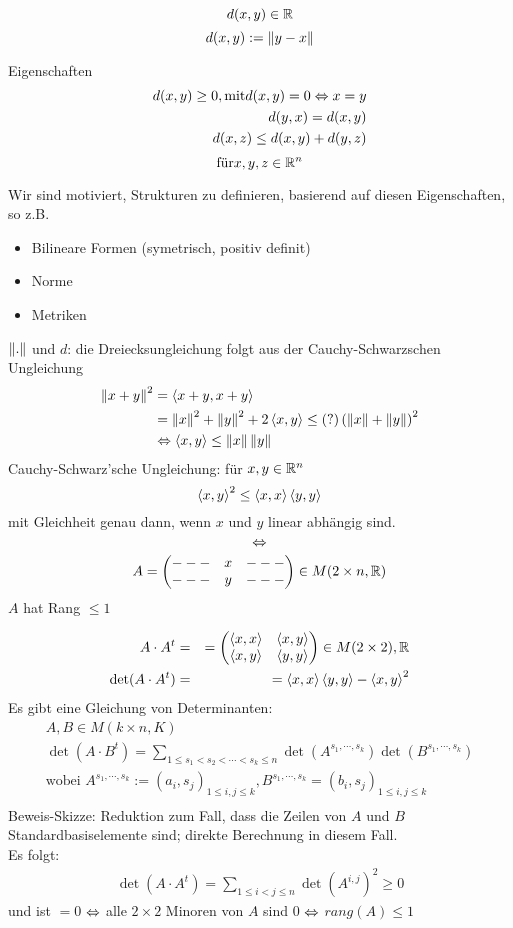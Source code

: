 \[d(x,y)\in\mathbb{R}\]
\[d(x,y):=\left\| y-x \right\|\]
\begin{Bem}{Eigenschaften}
\begin{align*}
  d(x,y)\geq0, \text{mit}d(x,y)=0 \Leftrightarrow x=y\\
  d(y,x)=d(x,y)\\
  d(x,z)\leq d(x,y)+d(y,z)
\end{align*}
\[\text{für} x,y,z\in\mathbb{R}^n\]
\end{Bem}
Wir sind motiviert, Strukturen zu definieren, basierend auf diesen Eigenschaften, so z.B.
\begin{itemize}
  \item Bilineare Formen (symetrisch, positiv definit)
  \item Norme
  \item Metriken
\end{itemize}
\begin{Bew} $\left\| . \right\|$ und $d$: die Dreiecksungleichung folgt aus der Cauchy-Schwarzschen Ungleichung
\begin{align*}
  \left\| x+y \right\|^2&=\left\langle x+y,x+y \right\rangle\\
  &=\left\| x \right\|^2+\left\| y \right\|^2+2\left\langle x,y \right\rangle \leq (?) \left(\left\| x \right\|+\left\| y \right\|\right)^2\\
  &\Leftrightarrow \left\langle x,y \right\rangle \leq \left\| x \right\|\left\| y \right\|
\end{align*}
Cauchy-Schwarz'sche Ungleichung: für $x,y\in\mathbb{R}^n$
\[\left\langle x,y \right\rangle^2\leq\left\langle x,x \right\rangle\left\langle y,y \right\rangle\]
mit Gleichheit genau dann, wenn $x$ und $y$ linear abhängig sind.
\[\Leftrightarrow\]
\[A=\begin{pmatrix}---&x&---\\---&y&---\end{pmatrix}\in M(2\times n,\mathbb{R})\]
$A$ hat Rang $\leq 1$
\end{Bew}
\begin{Bew}
\begin{align*}
  A\cdot{}A^t&=&=\begin{pmatrix}\left\langle x,x \right\rangle&\left\langle x,y \right\rangle\\\left\langle x,y \right\rangle&\left\langle y,y \right\rangle\end{pmatrix}\in M(2\times 2),\mathbb{R}\\
  \det(A\cdot{}A^t)&=&=\left\langle x,x \right\rangle\left\langle y,y \right\rangle-\left\langle x,y \right\rangle^2
\end{align*}
Es gibt eine Gleichung von Determinanten:
\begin{align*}
  A,B\in M(k\times n,K)\\
  \det(A\cdot B^t)=\sum_{1\leq s_1 <s_2<\cdots<s_k\leq n} \det(A^{s_1,\cdots,s_k})\det(B^{s_1,\cdots,s_k})\\
  \text{wobei } A^{s_1,\cdots,s_k}:=(a_i,s_j)_{1\leq i,j\leq k}, B^{s_1,\cdots,s_k}=(b_i,s_j)_{1\leq i,j\leq k}\\
\end{align*}
Beweis-Skizze: Reduktion zum Fall, dass die Zeilen von $A$ und $B$ Standardbasiselemente sind; direkte Berechnung in diesem Fall.\\
Es folgt:
\begin{align*}
  \det(A\cdot A^t)=\sum_{1\leq i < j \leq n} \det(A^{i,j})^2 \geq 0
\end{align*}
und ist $=0$ $\Leftrightarrow$ alle $2\times 2$ Minoren von $A$ sind 0 $\Leftrightarrow$ $rang(A)\leq 1$
\end{Bew}

